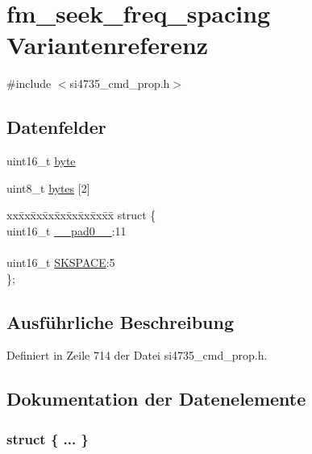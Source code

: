 \hypertarget{unionfm__seek__freq__spacing}{}\section{fm\+\_\+seek\+\_\+freq\+\_\+spacing Variantenreferenz}
\label{unionfm__seek__freq__spacing}


{\ttfamily \#include $<$si4735\+\_\+cmd\+\_\+prop.\+h$>$}

\subsection*{Datenfelder}
\begin{DoxyCompactItemize}
\item 
uint16\+\_\+t \hyperlink{unionfm__seek__freq__spacing_ab0549c1b5ea980a02e7eab77e21fea49}{byte}
\item 
uint8\+\_\+t \hyperlink{unionfm__seek__freq__spacing_a46e4c05d20a047ec169f60d3167e912e}{bytes} \mbox{[}2\mbox{]}
\item 
\begin{tabbing}
xx\=xx\=xx\=xx\=xx\=xx\=xx\=xx\=xx\=\kill
struct \{\\
\>uint16\_t \hyperlink{unionfm__seek__freq__spacing_a77132c2c26a75f5b8751b235cda23828}{\_\_pad0\_\_}:11\\
\>\\
\>uint16\_t \hyperlink{unionfm__seek__freq__spacing_a9f1888a9e6cdec1af67bb5764765df0b}{SKSPACE}:5\\
\}; \\

\end{tabbing}\end{DoxyCompactItemize}


\subsection{Ausführliche Beschreibung}


Definiert in Zeile 714 der Datei si4735\+\_\+cmd\+\_\+prop.\+h.



\subsection{Dokumentation der Datenelemente}
\hypertarget{unionfm__seek__freq__spacing_a5854d52fbd092ee6690d055523f0715f}{}\subsubsection[{"@85}]{\setlength{\rightskip}{0pt plus 5cm}struct \{ ... \} }\label{unionfm__seek__freq__spacing_a5854d52fbd092ee6690d055523f0715f}
\hypertarget{unionfm__seek__freq__spacing_a77132c2c26a75f5b8751b235cda23828}{}
